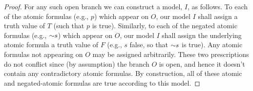 \documentclass[options]{philosophersimprint}
\begin{document}
\begin{proof}
For any such open branch we can construct a model, $I$, as follows. To each of the atomic formulas (e.g., $p$) which appear on $O$, our model $I$ shall assign a truth value of $T$ (such that $p$ is true). Similarly, to each of the negated atomic formulas (e.g., $\mathord{\sim} s$) which appear on $O$, our model $I$ shall assign the underlying atomic formula a truth value of $F$ (e.g., $s$ false, so that $\mathord{\sim} s$ is true). Any atomic formulas not appearing on $O$ may be assigned arbitrarily. These two prescriptions do not conflict since (by assumption) the branch $O$ is open, and hence it doesn't contain any contradictory atomic formulas. By construction, all of these atomic and negated-atomic formulas are true according to this model.
\end{proof}
\end{document}

